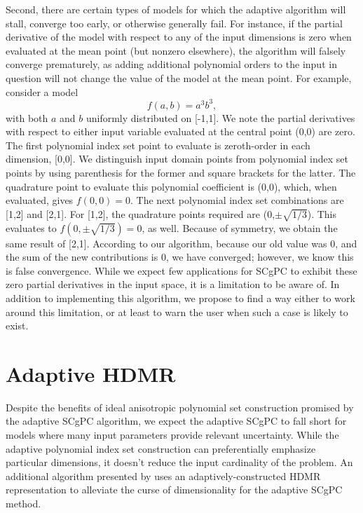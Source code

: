 Second, there are certain types of models for which the adaptive algorithm will stall, converge too early, or
otherwise generally fail.  For instance, if the partial derivative of the model with respect to any of the
input dimensions is zero when evaluated at the mean point (but nonzero elsewhere), the algorithm will falsely
converge prematurely, as adding additional polynomial orders to the input in question will not change the
value of the model at the mean point.  For example, consider a model
\begin{equation}
  f(a,b) = a^3b^3,
\end{equation}
with both $a$ and $b$ uniformly distributed on [-1,1].  We note the partial derivatives with respect to either
input variable evaluated at the central point (0,0) are zero.  The first polynomial index set point to
evaluate is zeroth-order in each dimension, [0,0].  We distinguish input domain points from polynomial index
set points by using parenthesis for the former and square brackets for the latter. The quadrature point to
evaluate this polynomial coefficient is (0,0), which, when evaluated, gives $f(0,0)=0$.  The next polynomial
index set combinations are [1,2] and [2,1].  For [1,2], the quadrature points required are
(0,$\pm\sqrt{1/3}$).  This evaluates to $f(0,\pm\sqrt{1/3})=0$, as well.  Because of symmetry, we obtain the
same result of [2,1].  According to our algorithm, because our old value was 0, and the sum of the new
contributions is 0, we have converged; however, we know this is false convergence.  While we expect few
applications for SCgPC to exhibit these zero partial derivatives in the input space, it is a limitation to be
aware of.  In addition to implementing this algorithm, we propose to find a way either to work around this
limitation, or at least to warn the user when such a case is likely to exist.


\section{Adaptive HDMR}
Despite the benefits of ideal anisotropic polynomial set construction promised by the adaptive SCgPC
algorithm, we expect the adaptive SCgPC to fall short for models where many input parameters provide relevant
uncertainty.  While the adaptive polynomial index set construction can preferentially emphasize particular
dimensions, it doesn't reduce the input cardinality of the problem.  An additional algorithm presented by
\cite{Ayres} uses an adaptively-constructed HDMR representation to alleviate the curse of dimensionality for
the adaptive SCgPC method.

